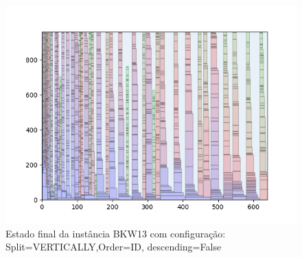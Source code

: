 \begin{figure}[H]
    \centering
    \caption[]{Estado final da instância BKW13 com configuração: Split=VERTICALLY,Order=ID, descending=False}
    \label{fig:bkw13-vertically-id-false}
    \includegraphics[scale=0.5]{output/figures/bkw/bkw13/vertically/id/false/0000}
\end{figure}
